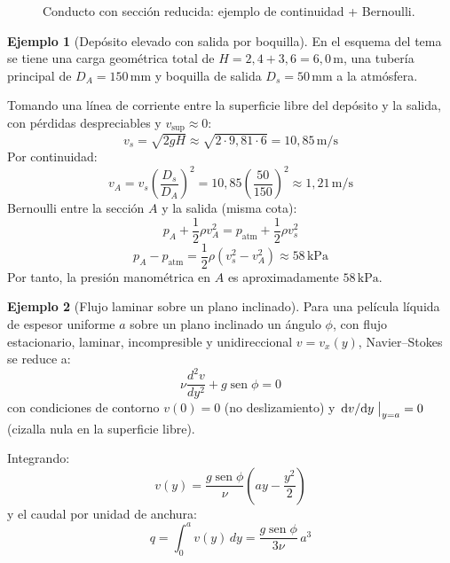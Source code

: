\documentclass[12pt, a4paper]{article}
\theoremstyle{plain}
\theoremstyle{definition}
\newtheorem{ejemplo}{Ejemplo}[section]
\theoremstyle{remark}
\DeclareMathOperator{\sen}{sen}
\begin{document}
\begin{figure}[H]
  \centering
  \caption{Conducto con sección reducida: ejemplo de continuidad + Bernoulli.}
\end{figure}

\begin{ejemplo}[Depósito elevado con salida por boquilla]
En el esquema del tema se tiene una carga geométrica total de $H=2{,}4+3{,}6=6{,}0\,\mathrm{m}$,
una tubería principal de $D_A=150\,\mathrm{mm}$ y boquilla de salida
$D_s=50\,\mathrm{mm}$ a la atmósfera.

Tomando una línea de corriente entre la superficie libre del depósito y la salida, con pérdidas
despreciables y $v_{\text{sup}}\approx 0$:
\begin{equation}
  v_s=\sqrt{2gH}\approx \sqrt{2\cdot 9{,}81\cdot 6}=10{,}85\,\mathrm{m/s}
\end{equation}
Por continuidad:
\begin{equation}
  v_A=v_s\left(\frac{D_s}{D_A}\right)^2
     =10{,}85\left(\frac{50}{150}\right)^2
     \approx 1{,}21\,\mathrm{m/s}
\end{equation}
Bernoulli entre la sección $A$ y la salida (misma cota):
\begin{equation}
  p_A+\frac{1}{2}\rho v_A^2
  =p_{\mathrm{atm}}+\frac{1}{2}\rho v_s^2
\end{equation}
\begin{equation}
  p_A-p_{\mathrm{atm}}
  =\frac{1}{2}\rho\left(v_s^2-v_A^2\right)
  \approx 58\,\mathrm{kPa}
\end{equation}
Por tanto, la presión manométrica en $A$ es aproximadamente $58\,\mathrm{kPa}$.
\end{ejemplo}

\begin{ejemplo}[Flujo laminar sobre un plano inclinado]
Para una película líquida de espesor uniforme $a$ sobre un plano inclinado un ángulo $\phi$,
con flujo estacionario, laminar, incompresible y unidireccional $v=v_x(y)$, Navier--Stokes se
reduce a:
\begin{equation}
  \nu\frac{d^2v}{dy^2} + g\sen\phi = 0
\end{equation}
con condiciones de contorno $v(0)=0$ (no deslizamiento) y
$\dv*{v}{y}\big|_{y=a}=0$ (cizalla nula en la superficie libre).

Integrando:
\begin{equation}
  v(y) = \frac{g\sen\phi}{\nu}\left(ay-\frac{y^2}{2}\right)
\end{equation}
y el caudal por unidad de anchura:
\begin{equation}
  q=\int_0^a v(y)\,dy = \frac{g\sen\phi}{3\nu}\,a^3
\end{equation}
\end{ejemplo}
\end{document}
